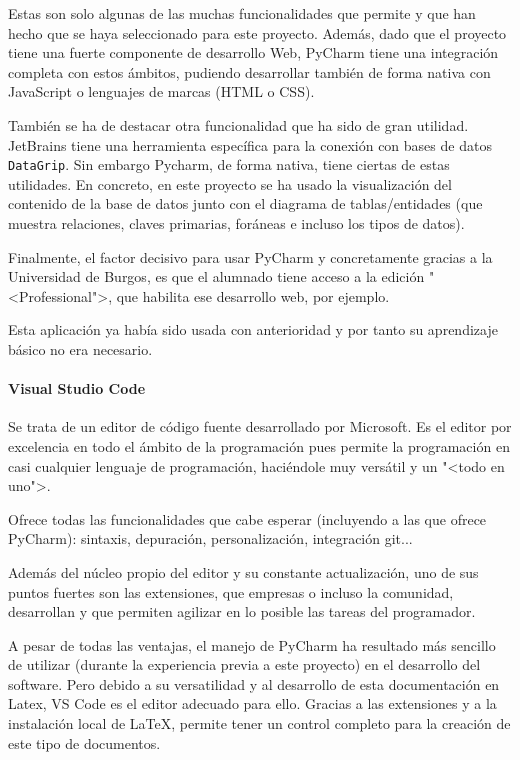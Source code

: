 Estas son solo algunas de las muchas funcionalidades que permite y que han hecho
que se haya seleccionado para este proyecto. Además, dado que el proyecto tiene
una fuerte componente de desarrollo Web, PyCharm tiene una integración completa
con estos ámbitos, pudiendo desarrollar también de forma nativa con JavaScript o
lenguajes de marcas (HTML o CSS).

También se ha de destacar otra funcionalidad que ha sido de gran utilidad.
JetBrains tiene una herramienta específica para la conexión con bases de datos
\texttt{DataGrip}. Sin embargo Pycharm, de forma nativa, tiene ciertas de estas
utilidades. En concreto, en este proyecto se ha usado la visualización del
contenido de la base de datos junto con el diagrama de tablas/entidades (que
muestra relaciones, claves primarias, foráneas e incluso los tipos de datos).

Finalmente, el factor decisivo para usar PyCharm y concretamente gracias a la
Universidad de Burgos, es que el alumnado tiene acceso a la edición
"<Professional">, que habilita ese desarrollo web, por ejemplo.

Esta aplicación ya había sido usada con anterioridad y por tanto su aprendizaje
básico no era necesario.

\paragraph{Visual Studio Code}
Se trata de un editor de código fuente desarrollado por Microsoft. Es el editor
por excelencia en todo el ámbito de la programación pues permite la programación
en casi cualquier lenguaje de programación, haciéndole muy versátil y un "<todo
en uno">.

Ofrece todas las funcionalidades que cabe esperar (incluyendo a las que ofrece
PyCharm): sintaxis, depuración, personalización, integración git...

Además del núcleo propio del editor y su constante actualización, uno de sus
puntos fuertes son las extensiones, que empresas o incluso la comunidad,
desarrollan y que permiten agilizar en lo posible las tareas del programador.

A pesar de todas las ventajas, el manejo de PyCharm ha resultado más sencillo de
utilizar (durante la experiencia previa a este proyecto) en el desarrollo del
software. Pero debido a su versatilidad y al desarrollo de esta documentación en
Latex, VS Code es el editor adecuado para ello. Gracias a las extensiones y a la
instalación local de \LaTeX, permite tener un control completo para la creación
de este tipo de documentos.

